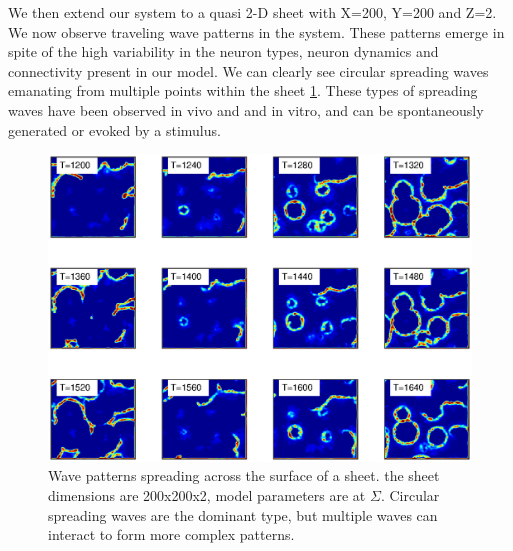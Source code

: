 We then extend our system to a quasi 2-D sheet with X=200, Y=200 and Z=2.
We now observe traveling wave patterns in the system.
These patterns emerge in spite of the high variability in the neuron types, neuron dynamics and connectivity present in our model.
We can clearly see  circular spreading waves emanating from multiple points within the sheet \ref{fig:2D_waves}.
These types of spreading waves have been observed in vivo\citep{Mohajerani2013} and and in vitro, and can be spontaneously generated or evoked by a stimulus\citep{Stroh2013}.
\begin{figure}[!htb]
 \caption{ Wave patterns spreading across the surface of a sheet. 
           the sheet dimensions are 200x200x2, model parameters are at $\Sigma$. 
           Circular spreading waves are the dominant type, but multiple waves can interact to form more complex patterns.}
 \label{fig:2D_waves}
 \centering
   \includegraphics[width=\textwidth]{fig/2DSpreadingWaves_Sigma}
\end{figure}

\FloatBarrier

